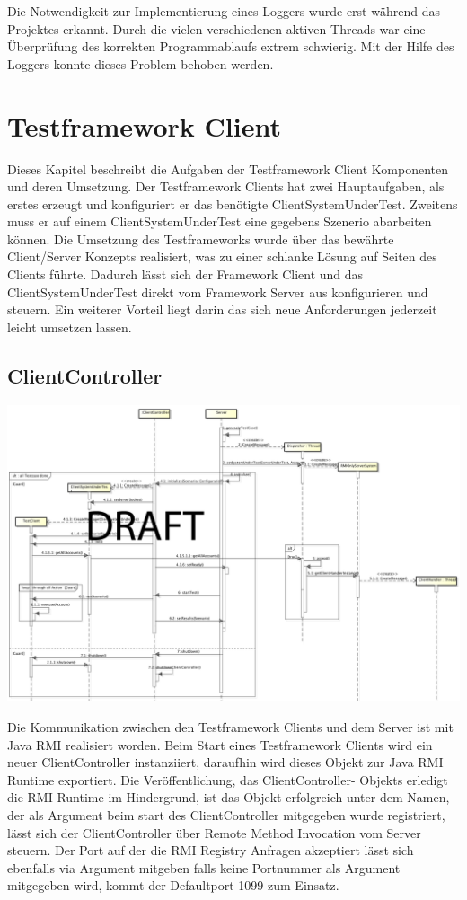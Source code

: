Die Notwendigkeit zur Implementierung eines Loggers wurde erst während das Projektes erkannt. Durch die vielen verschiedenen aktiven Threads war eine Überprüfung des korrekten Programmablaufs extrem schwierig. Mit der Hilfe des Loggers konnte dieses Problem behoben werden.

\section{Testframework Client}
\label{sec:test-FW Client}
Dieses Kapitel beschreibt die Aufgaben der Testframework Client Komponenten und deren Umsetzung. Der Testframework Clients hat zwei Hauptaufgaben, als erstes erzeugt und konfiguriert er das benötigte ClientSystemUnderTest. Zweitens muss er auf einem ClientSystemUnderTest eine gegebens Szenerio abarbeiten können. Die Umsetzung des Testframeworks wurde über das bewährte Client/Server Konzepts realisiert, was zu einer schlanke Lösung auf Seiten des Clients führte. Dadurch lässt sich der Framework Client und das ClientSystemUnderTest direkt vom Framework Server aus konfigurieren und steuern. Ein weiterer Vorteil liegt darin das sich neue Anforderungen jederzeit leicht umsetzen lassen.


\subsection{ClientController}
\label{sec:clientController}

\begin{center}
\includegraphics[scale=0.2]{image_testFramework/TestFWServerClientSeq.png}
\end{center}
 
Die Kommunikation zwischen den Testframework Clients und dem Server ist mit Java RMI realisiert worden. Beim Start eines Testframework Clients wird ein neuer ClientController instanziiert, daraufhin wird dieses Objekt zur Java RMI Runtime exportiert. Die Veröffentlichung, das ClientController- Objekts erledigt die RMI Runtime im Hindergrund, ist das Objekt erfolgreich unter dem Namen, der als Argument beim start des ClientController mitgegeben wurde registriert, lässt sich der ClientController über Remote Method Invocation vom Server steuern. Der Port auf der die RMI Registry Anfragen akzeptiert lässt sich ebenfalls via Argument mitgeben falls keine Portnummer als Argument mitgegeben wird, kommt der Defaultport 1099 zum Einsatz.

